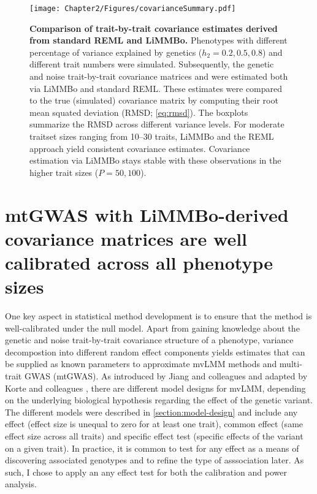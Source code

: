 \begin{figure}[h]
	\centering	
	\texttt{[image: Chapter2/Figures/covarianceSummary.pdf]}\\
	\caption[\textbf{Comparison of trait-by-trait covariance estimates derived from standard REML and LiMMBo.}]{\textbf{Comparison of trait-by-trait covariance estimates derived from standard REML and LiMMBo.} Phenotypes with different percentage of variance explained by genetics (\(h_2={0.2, 0.5, 0.8}\)) and different trait numbers were simulated. Subsequently, the genetic and noise trait-by-trait covariance matrices  and  were estimated both via LiMMBo and standard REML. These estimates were compared to the true (simulated) covariance matrix by computing their root mean squated deviation (RMSD; \cref{eq:rmsd}). The boxplots summarize the RMSD across different variance levels. For moderate traitset sizes ranging from \numrange{10}{30} traits, LiMMBo and the REML approach yield consistent covariance estimates. Covariance estimation via LiMMBo stays stable with these observations in the higher trait sizes (\(P={50,100}\)). }
	  \label{fig:covsimilarity}%
\end{figure}

\section{mtGWAS with LiMMBo-derived covariance matrices are well calibrated across all phenotype sizes}
\label{section:calibration-limmbo}
One key aspect in statistical method development is to ensure that the method is well-calibrated under the null model. Apart from gaining knowledge about the genetic and noise trait-by-trait covariance structure of a phenotype, variance decompostion into different random effect components yields estimates that can be supplied as known parameters to approximate mvLMM methods and multi-trait GWAS (mtGWAS). As introduced by Jiang and colleagues \citeyear{Jiang1995} and adapted by Korte and colleagues \citeyear{Korte2012}, there are different model designs for mvLMM, depending on the underlying biological hypothesis regarding the effect of the genetic variant. The different models were described in \cref{section:model-design} and include any effect (effect size is unequal to zero for at least one trait), common effect (same effect size across all traits) and specific effect test (specific effects of the variant on a given trait). In practice, it is common to test for any effect as a means of discovering associated genotypes and to refine the type of asssociation later. As such, I chose to apply an any effect test for both the calibration and power analysis.

